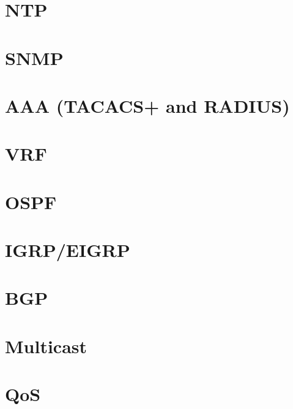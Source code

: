 \documentclass{article}
\begin{document}
\section*{NTP}

\section*{SNMP}

\section*{AAA (TACACS+ and RADIUS)}

\section*{VRF}

\section*{OSPF}

\section*{IGRP/EIGRP}

\section*{BGP}

\section*{Multicast}

\section*{QoS}
\end{document}

